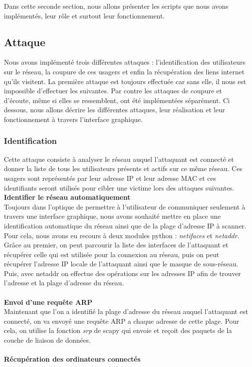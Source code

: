 \documentclass[11pt]{article}
\begin{document}
Dans cette seconde section, nous allons présenter les scripts que nous avons implémentés, leur rôle et surtout leur fonctionnement.
\subsection{Attaque}
Nous avons implémenté trois différentes attaques : l'identification des utilisateurs sur le réseau, la coupure de ces usagers et enfin la récupération des liens internet qu'ils visitent. La première attaque est toujours effectuée car sans elle, il nous est impossible d'effectuer les suivantes. Par contre les attaques de coupure et d'écoute, même si elles se ressemblent, ont été implémentées séparément. Ci dessous, nous allons décrire les différentes attaques, leur réalisation et leur fonctionnement à travers l'interface graphique.
\subsubsection{Identification}
Cette attaque consiste à analyser le réseau auquel l'attaquant est connecté et donner la liste de tous les utilisateurs présents et actifs sur ce même réseau. Ces usagers sont représentés par leur adresse IP et leur adresse MAC et ces identifiants seront utilisés pour cibler une victime lors des attaques suivantes. ~\\

\textbf{Identifier le réseau automatiquement}~\\

Toujours dans l'optique de permettre à l'utilisateur de communiquer seulement à travers une interface graphique, nous avons souhaité mettre en place une identification automatique du réseau ainsi que de la plage d'adresse IP à scanner. Pour cela, nous avons eu recours à deux modules python : \textit{netifaces} et \textit{netaddr}. Grâce au premier, on peut parcourir la liste des interfaces de l'attaquant et récupérer celle qui est utilisée pour la connexion au réseau, puis on peut récupérer l'adresse IP locale de l'attaquant ainsi que le masque de sous-réseau. Puis, avec netaddr on effectue des opérations sur les adresses IP afin de trouver l'adresse et la plage d'adresse du réseau. ~\\
~\\

\textbf{Envoi d'une requête ARP}~\\

Maintenant que l'on a identifié la plage d'adresse du réseau auquel l'attaquant est connecté, on va envoyé une requête ARP a chaque adresse de cette plage. Pour cela, on utilise la fonction \textit{srp} de scapy qui envoie et reçoit des paquets de la couche de liaison de données.~\\
~\\
\textbf{Récupération des ordinateurs connectés}~\\
\end{document}
